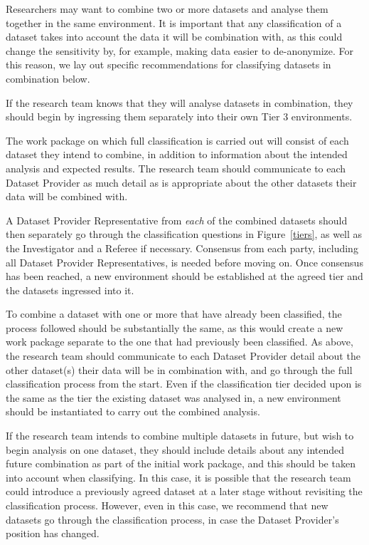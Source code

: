 \documentclass[10pt,a4paper,twocolumn]{article}
\begin{document}
Researchers may want to combine two or more datasets and analyse them together in the same environment. It is important that any classification of a dataset takes into account the data it will be combination with, as this could change the sensitivity by, for example, making data easier to de-anonymize. For this reason, we lay out specific recommendations for classifying datasets in combination below.

If the research team knows that they will analyse datasets in combination, they should begin by ingressing them separately into their own Tier 3 environments. 

The work package on which full classification is carried out will consist of each dataset they intend to combine, in addition to information about the intended analysis and expected results. The research team should communicate to each Dataset Provider as much detail as is appropriate about the other datasets their data will be combined with. 

A Dataset Provider Representative from \textit{each} of the combined datasets should then separately go through the classification questions in Figure~\ref{tiers}, as well as the Investigator and a Referee if necessary. Consensus from each party, including all Dataset Provider Representatives, is needed before moving on. Once consensus has been reached, a new environment should be established at the agreed tier and the datasets ingressed into it.

To combine a dataset with one or more that have already been classified, the process followed should be substantially the same, as this would create a new work package separate to the one that had previously been classified. As above, the research team should communicate to each Dataset Provider detail about the other dataset(s) their data will be in combination with, and go through the full classification process from the start. Even if the classification tier decided upon is the same as the tier the existing dataset was analysed in, a new environment should be instantiated to carry out the combined analysis.

If the research team intends to combine multiple datasets in future, but wish to begin analysis on one dataset, they should include details about any intended future combination as part of the initial work package, and this should be taken into account when classifying. In this case, it is possible that the research team could introduce a previously agreed dataset at a later stage without revisiting the classification process. However, even in this case, we recommend that new datasets go through the classification process, in case the Dataset Provider's position has changed.
\end{document}
